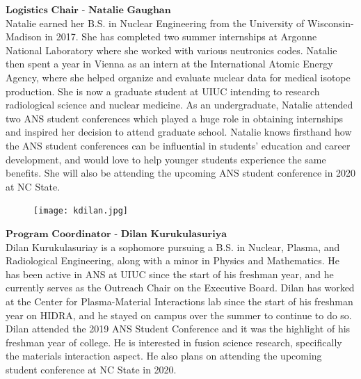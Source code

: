$\textbf{Logistics Chair - Natalie Gaughan}$\\
Natalie earned her B.S. in Nuclear Engineering from the University of Wisconsin-Madison in 2017. She has completed two summer internships at Argonne National Laboratory where she worked with various neutronics codes. Natalie then spent a year in Vienna as an intern at the International Atomic Energy Agency, where she helped organize and evaluate nuclear data for medical isotope production. She is now a graduate student at UIUC intending to research radiological science and nuclear medicine. As an undergraduate, Natalie attended two ANS student conferences which played a huge role in obtaining internships and inspired her decision to attend graduate school. Natalie knows firsthand how the ANS student conferences can be influential in students’ education and career development, and would love to help younger students experience the same benefits. She will also be attending the upcoming ANS student conference in 2020 at NC State.

\setlength\intextsep{0pt}
\begin{figure}
	\begin{center}
		\vspace{-\baselineskip}
		\texttt{[image: kdilan.jpg]}
	\end{center}
\end{figure}
$\textbf{Program Coordinator - Dilan Kurukulasuriya}$\\
Dilan Kurukulasuriay is a sophomore pursuing a B.S. in Nuclear, Plasma, and Radiological Engineering, along with a minor in Physics and Mathematics. He has been active in ANS at UIUC since the start of his freshman year, and he currently serves as the Outreach Chair on the Executive Board. Dilan has worked at the Center for Plasma-Material Interactions lab since the start of his freshman year on HIDRA, and he stayed on campus over the summer to continue to do so. Dilan attended the 2019 ANS Student Conference and it was the highlight of his freshman year of college. He is interested in fusion science research, specifically the materials interaction aspect. He also plans on attending the upcoming student conference at NC State in 2020.


